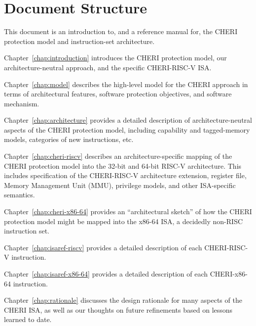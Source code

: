 \section{Document Structure}

This document is an introduction to, and a reference manual for, the CHERI
protection model and instruction-set architecture.

\medskip
\noindent
Chapter~\ref{chap:introduction} introduces the CHERI protection model, our
architecture-neutral approach, and the specific CHERI-RISC-V ISA.

\medskip
\noindent
Chapter~\ref{chap:model} describes the high-level model for the CHERI approach
in terms of architectural features, software protection objectives, and
software mechanism.

\medskip
\noindent
Chapter~\ref{chap:architecture} provides a detailed description of
architecture-neutral aspects of the CHERI protection model, including
capability and tagged-memory models, categories of new instructions, etc.

\medskip
\noindent
Chapter~\ref{chap:cheri-riscv} describes an architecture-specific mapping
of the CHERI protection model into the 32-bit and 64-bit RISC-V architecture.
This includes specification of the CHERI-RISC-V architecture extension,
register file, Memory Management Unit (MMU), privilege models, and other
ISA-specific semantics.

\medskip
\noindent
Chapter~\ref{chap:cheri-x86-64} provides an ``architectural sketch'' of how
the CHERI protection model might be mapped into the x86-64 ISA, a decidedly
non-RISC instruction set.

\medskip
\noindent
Chapter~\ref{chap:isaref-riscv} provides a detailed description of each
CHERI-RISC-V instruction.

\medskip
\noindent
Chapter~\ref{chap:isaref-x86-64} provides a detailed description of each
CHERI-x86-64 instruction.

\medskip
\noindent
Chapter~\ref{chap:rationale} discusses the design rationale for many aspects
of the CHERI ISA, as well as our thoughts on future refinements based on
lessons learned to date.

